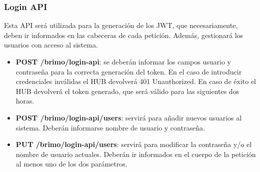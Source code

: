 \subsubsection{Login API}
Esta API será utilizada para la generación de los JWT, que necesariamente, deben ir informados en las cabeceras de cada petición. Además, gestionará
los usuarios con acceso al sistema.
\begin{itemize}
\setlength\itemsep{6pt plus 1pt minus 1pt}
\item \textbf{POST /brimo/login-api}: se deberán informar los campos usuario y contraseña para la correcta generación del token. En el caso
de introducir credenciales inválidas el HUB devolverá 401 Unauthorized. En caso de éxito el HUB devolverá el token generado, que será válido
para las siguientes dos horas.
\item \textbf{POST /brimo/login-api/users}: servirá para añadir nuevos usuarios al sistema. Deberán informarse nombre de usuario y contraseña.
\item \textbf{PUT /brimo/login-api/users}: servirá para modificar la contraseña y/o el nombre de usuario actuales. Deberán ir informados en el
cuerpo de la petición al menos uno de los dos parámetros.
\end{itemize}